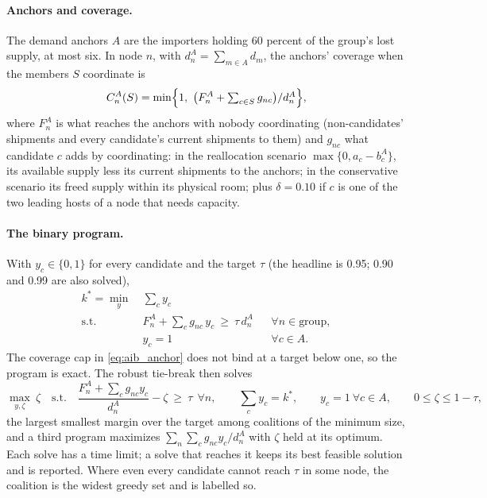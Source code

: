 \paragraph{Anchors and coverage.} The demand anchors $A$ are the importers holding 60 percent of the
group's lost supply, at most six. In node $n$, with $d^A_n=\sum_{m\in A}d_m$, the anchors' coverage when
the members $S$ coordinate is
\begin{equation}\label{eq:aib_anchor}
  C^A_n(S)=\min\Bigl\{1,\ \bigl(F^A_n+\textstyle\sum_{c\in S}g_{nc}\bigr)/d^A_n\Bigr\},
\end{equation}
where $F^A_n$ is what reaches the anchors with nobody coordinating (non-candidates' shipments and every
candidate's current shipments to them) and $g_{nc}$ what candidate $c$ adds by coordinating: in the
reallocation scenario $\max\{0,a_c-b^A_c\}$, its available supply less its current shipments to the
anchors; in the conservative scenario its freed supply within its physical room; plus $\delta=0.10$ if
$c$ is one of the two leading hosts of a node that needs capacity.

\paragraph{The binary program.} With $y_c\in\{0,1\}$ for every candidate and the target $\tau$ (the
headline is 0.95; 0.90 and 0.99 are also solved),
\begin{subequations}\label{eq:aib_coalition}
\begin{align}
  k^{*}=\min_{y}\ & \textstyle\sum_c y_c \label{eq:aib_coal_obj}\\
  \text{s.t.}\ & F^A_n+\textstyle\sum_c g_{nc}\,y_c\ \ge\ \tau\,d^A_n && \forall n\in\text{group},\label{eq:aib_coal_target}\\
  & y_c=1 && \forall c\in A. \label{eq:aib_coal_anchor}
\end{align}
\end{subequations}
The coverage cap in \eqref{eq:aib_anchor} does not bind at a target below one, so the program is
exact. The robust tie-break then solves
\begin{equation}\label{eq:aib_robust}
  \max_{y,\zeta}\ \zeta\quad\text{s.t.}\quad \frac{F^A_n+\sum_c g_{nc}y_c}{d^A_n}-\zeta\ \ge\ \tau\ \ \forall n,\qquad
  \textstyle\sum_c y_c=k^{*},\qquad y_c=1\ \forall c\in A,\qquad 0\le\zeta\le1-\tau,
\end{equation}
the largest smallest margin over the target among coalitions of the minimum size, and a third program
maximizes $\sum_n\sum_c g_{nc}y_c/d^A_n$ with $\zeta$ held at its optimum. Each solve has a time limit;
a solve that reaches it keeps its best feasible solution and is reported. Where even every candidate
cannot reach $\tau$ in some node, the coalition is the widest greedy set and is labelled so.

